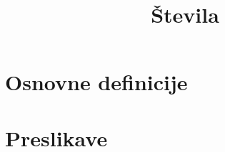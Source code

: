 \documentclass[11pt]{article}
\title{Števila}
\begin{document}
    \maketitle

    \section{Osnovne definicije}
    

    \section{Preslikave}
    
\end{document}
